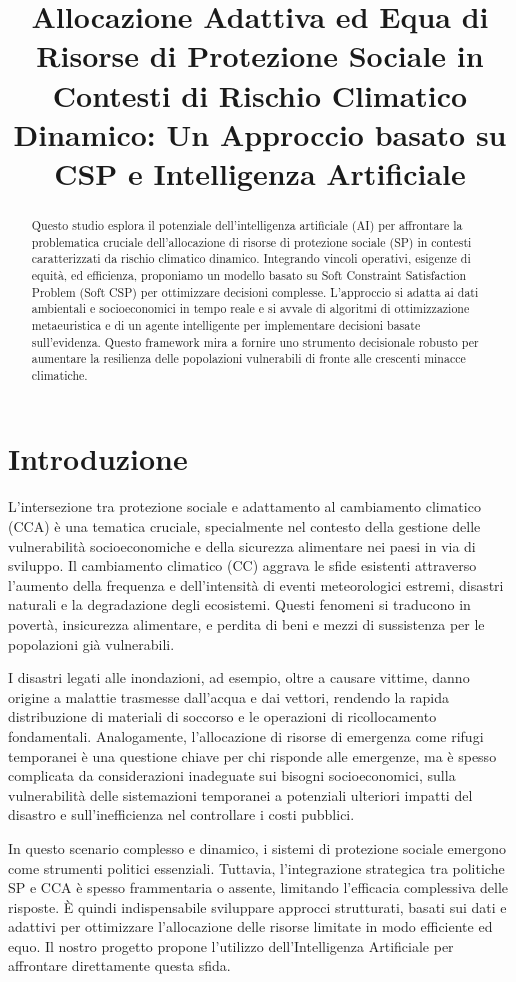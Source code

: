 \documentclass[letterpaper]{article}
\title{Allocazione Adattiva ed Equa di Risorse di Protezione Sociale in Contesti di Rischio Climatico Dinamico: Un Approccio basato su CSP e Intelligenza Artificiale}
\author{}
\date{}
\begin{document}
\maketitle

\begin{abstract}
    Questo studio esplora il potenziale dell'intelligenza artificiale (AI) per affrontare la problematica cruciale dell'allocazione di risorse di protezione sociale (SP) in contesti caratterizzati da rischio climatico dinamico. Integrando vincoli operativi, esigenze di equità, ed efficienza, proponiamo un modello basato su Soft Constraint Satisfaction Problem (Soft CSP) per ottimizzare decisioni complesse. L'approccio si adatta ai dati ambientali e socioeconomici in tempo reale e si avvale di algoritmi di ottimizzazione metaeuristica e di un agente intelligente per implementare decisioni basate sull'evidenza. Questo framework mira a fornire uno strumento decisionale robusto per aumentare la resilienza delle popolazioni vulnerabili di fronte alle crescenti minacce climatiche.
\end{abstract}

\section{Introduzione}
L'intersezione tra protezione sociale e adattamento al cambiamento climatico (CCA) è una tematica cruciale, specialmente nel contesto della gestione delle vulnerabilità socioeconomiche e della sicurezza alimentare nei paesi in via di sviluppo. Il cambiamento climatico (CC) aggrava le sfide esistenti attraverso l'aumento della frequenza e dell'intensità di eventi meteorologici estremi, disastri naturali e la degradazione degli ecosistemi. Questi fenomeni si traducono in povertà, insicurezza alimentare, e perdita di beni e mezzi di sussistenza per le popolazioni già vulnerabili.

I disastri legati alle inondazioni, ad esempio, oltre a causare vittime, danno origine a malattie trasmesse dall'acqua e dai vettori, rendendo la rapida distribuzione di materiali di soccorso e le operazioni di ricollocamento fondamentali. Analogamente, l'allocazione di risorse di emergenza come rifugi temporanei è una questione chiave per chi risponde alle emergenze, ma è spesso complicata da considerazioni inadeguate sui bisogni socioeconomici, sulla vulnerabilità delle sistemazioni temporanei a potenziali ulteriori impatti del disastro e sull'inefficienza nel controllare i costi pubblici.

In questo scenario complesso e dinamico, i sistemi di protezione sociale emergono come strumenti politici essenziali. Tuttavia, l'integrazione strategica tra politiche SP e CCA è spesso frammentaria o assente, limitando l'efficacia complessiva delle risposte. È quindi indispensabile sviluppare approcci strutturati, basati sui dati e adattivi per ottimizzare l'allocazione delle risorse limitate in modo efficiente ed equo. Il nostro progetto propone l'utilizzo dell'Intelligenza Artificiale per affrontare direttamente questa sfida.
\end{document}
